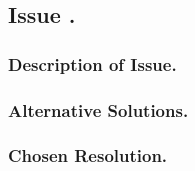 \subsection*{Issue \theissue{}.}

\subsubsection*{Description of Issue.}

\subsubsection*{Alternative Solutions.}

\subsubsection*{Chosen Resolution.}

\pagebreak

